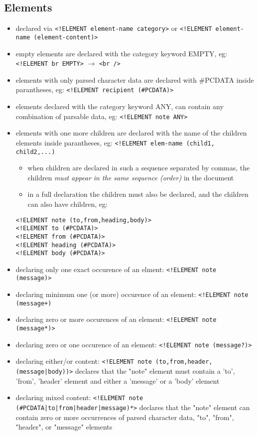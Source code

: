 \documentclass[11pt]{article}
\begin{document}
\subsection{Elements}
\label{sec:org511faaa}
\begin{itemize}
\item declared via \texttt{<!ELEMENT element-name category>} or \texttt{<!ELEMENT element-name (element-content)>}
\item empty elements are declared with the category keyword EMPTY, eg: \texttt{<!ELEMENT br EMPTY>} \(\rightarrow\) \texttt{<br />}
\item elements with only parsed character data are declared with \#PCDATA inside parantheses, eg: \texttt{<!ELEMENT recipient (\#PCDATA)>}
\item elements declared with the category keyword ANY, can contain any combination of parsable data, eg: \texttt{<!ELEMENT note ANY>}
\item elements with one more children are declared with the name of the children elements inside parantheses, eg: \texttt{<!ELEMENT elem-name (child1, child2,...)}
\begin{itemize}
\item when children are declared in such a sequence separated by commas, the children \emph{must appear in the same sequence (order)} in the document
\item in a full declaration the children must also be declared, and the children can also have children, eg:
\end{itemize}
\lstset{breaklines=true,language=XML,label= ,caption= ,captionpos=b,numbers=none}
\begin{lstlisting}
<!ELEMENT note (to,from,heading,body)>
<!ELEMENT to (#PCDATA)>
<!ELEMENT from (#PCDATA)>
<!ELEMENT heading (#PCDATA)>
<!ELEMENT body (#PCDATA)>
\end{lstlisting}
\item declaring only one exact occurence of an elment: \texttt{<!ELEMENT note (message)>}
\item declaring minimum one (or more) occurence of an element: \texttt{<!ELEMENT note (message+)}
\item declaring zero or more occurences of an element: \texttt{<!ELEMENT note (message*)>}
\item declaring zero or one occurence of an element: \texttt{<!ELEMENT note (message?)>}
\item declaring either/or content: \texttt{<!ELEMENT note (to,from,header,(message|body))>} declares that the "note" element must contain a 'to', 'from', 'header' element and either a 'message' or a 'body' element
\item declaring mixed content: \texttt{<!ELEMENT note (\#PCDATA|to|from|header|message)*>} declares that the "note" element can contain zero or more occurrences of parsed character data, "to", "from", "header", or "message" elements
\end{itemize}
\end{document}
